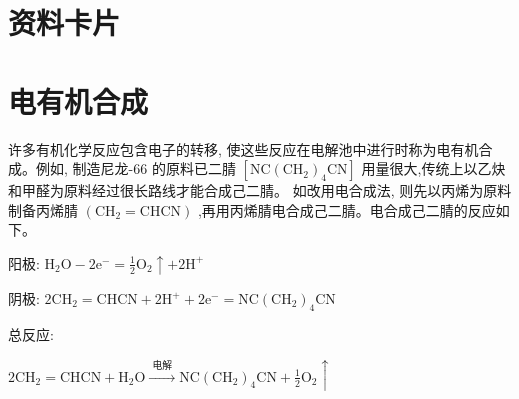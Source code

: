 \documentclass[10pt]{article}
\begin{document}
\begin{center}
\end{center}

\section*{资料卡片}

\section*{电有机合成}

许多有机化学反应包含电子的转移, 使这些反应在电解池中进行时称为电有机合成。例如, 制造尼龙-66 的原料已二腈 \(\left\lbrack {\mathrm{{NC}}{\left( {\mathrm{{CH}}}_{2}\right) }_{4}\mathrm{{CN}}}\right\rbrack\) 用量很大,传统上以乙炔和甲醛为原料经过很长路线才能合成己二腈。 如改用电合成法, 则先以丙烯为原料制备丙烯腈 \(\left( {{\mathrm{{CH}}}_{2} = \mathrm{{CHCN}}}\right)\) ,再用丙烯腈电合成己二腈。电合成己二腈的反应如下。

阳极: \({\mathrm{H}}_{2}\mathrm{O} - 2{\mathrm{e}}^{ - } = \frac{1}{2}{\mathrm{O}}_{2} \uparrow + 2{\mathrm{H}}^{ + }\)

阴极: \(2{\mathrm{{CH}}}_{2} = \mathrm{{CHCN}} + 2{\mathrm{H}}^{ + } + 2{\mathrm{e}}^{ - } = \mathrm{{NC}}{\left( {\mathrm{{CH}}}_{2}\right) }_{4}\mathrm{{CN}}\)

总反应:

\(2{\mathrm{{CH}}}_{2} = \mathrm{{CHCN}} + {\mathrm{H}}_{2}\mathrm{O}\xrightarrow[]{\text{ 电解 }}\mathrm{{NC}}{\left( {\mathrm{{CH}}}_{2}\right) }_{4}\mathrm{{CN}} + \frac{1}{2}{\mathrm{O}}_{2} \uparrow\)
\end{document}
